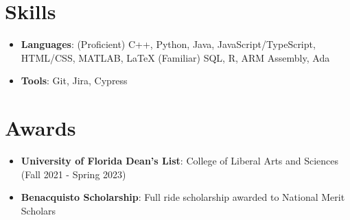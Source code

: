 \documentclass[letterpaper,11pt]{article}
\newcommand{\resumeItemSkills}[2]{
  \item\normalsize{
    \textbf{#1}{: #2 \vspace{-2pt}}
  }
}
\newcommand{\resumeSubItemSkills}[2]{\resumeItemSkills{#1}{#2}\vspace{-4pt}}
\newcommand{\resumeSubHeadingListStartSkillsAwards}{\begin{itemize}[leftmargin=*]}
\newcommand{\resumeSubHeadingListEnd}{\end{itemize}}
\begin{document}
\section{Skills}
  \resumeSubHeadingListStartSkillsAwards
    \resumeSubItemSkills{Languages}{(Proficient) C++, Python, Java, JavaScript/TypeScript, HTML/CSS, MATLAB, LaTeX \newline
    (Familiar) SQL, R, ARM Assembly, Ada}
    \resumeSubItemSkills{Tools}{Git, Jira, Cypress}
  \resumeSubHeadingListEnd

\section{Awards}
  \resumeSubHeadingListStartSkillsAwards
    \resumeSubItemSkills{University of Florida Dean's List}
      {College of Liberal Arts and Sciences (Fall 2021 - Spring 2023)}
    \resumeSubItemSkills{Benacquisto Scholarship}
      {Full ride scholarship awarded to National Merit Scholars}
  \resumeSubHeadingListEnd
  
\end{document}
